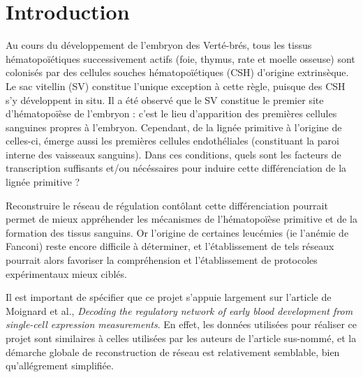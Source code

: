 \documentclass[fleqn,11pt]{SelfArx} %
\affiliation{\textsuperscript{1}\textit{Master 2 Bioinformatique et Modélisation, Université Paris 6, France}}
\affiliation{\textsuperscript{2}\textit{Institut Curie, France}}
\begin{document}
\flushbottom 
\maketitle


\tableofcontents 

\thispagestyle{empty} 


\section*{Introduction}
Au cours du développement de l'embryon des Verté-brés, tous les tissus hématopoïétiques successivement actifs (foie, thymus, rate et moelle osseuse) sont colonisés par des cellules souches hématopoïétiques (CSH) d'origine extrinsèque. Le sac vitellin (SV) constitue l'unique exception à cette règle, puisque des CSH s'y développent in situ. Il a été observé que le SV constitue le premier site d'hématopoïèse de l'embryon\cite{Cumano} : c'est le lieu d'apparition des premières cellules sanguines propres à l'embryon. Cependant, de la lignée primitive à l'origine de celles-ci, émerge aussi les premières cellules endothéliales (constituant la paroi interne des vaisseaux sanguins). Dans ces conditions, quels sont les facteurs de transcription suffisants et/ou nécéssaires pour induire cette différenciation de la lignée primitive ?

\par Reconstruire le réseau de régulation contôlant cette différenciation pourrait permet de mieux appréhender les mécanismes de l'hématopoïèse primitive et de la formation des tissus sanguins. Or l'origine de certaines leucémies (ie l'anémie de Fanconi\cite{Fanconi}) reste encore difficile à déterminer, et l'établissement de tels réseaux pourrait alors favoriser la compréhension et l'établissement de protocoles expérimentaux mieux ciblés. 
 
\par Il est important de spécifier que ce projet s'appuie largement sur l'article de Moignard et al., \textit{Decoding the regulatory network of early blood development from single-cell expression measurements}\cite{Moignard}. En effet, les données utilisées pour réaliser ce projet sont similaires à celles utilisées par les auteurs de l'article sus-nommé, et la démarche globale de reconstruction de réseau est relativement semblable, bien qu'allégrement simplifiée. 
\end{document}
